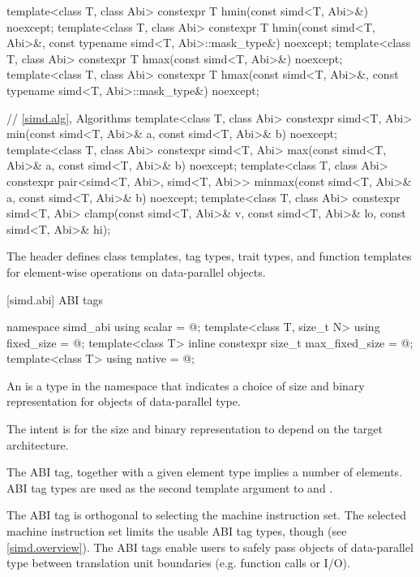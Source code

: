 \begin{codeblock}
{  template<class T, class Abi>
    constexpr T hmin(const simd<T, Abi>&) noexcept;
  template<class T, class Abi>
    constexpr T hmin(const simd<T, Abi>&, const typename simd<T, Abi>::mask_type&) noexcept;
  template<class T, class Abi>
    constexpr T hmax(const simd<T, Abi>&) noexcept;
  template<class T, class Abi>
    constexpr T hmax(const simd<T, Abi>&, const typename simd<T, Abi>::mask_type&) noexcept;

  // \ref{simd.alg}, Algorithms
  template<class T, class Abi>
    constexpr simd<T, Abi>
      min(const simd<T, Abi>& a, const simd<T, Abi>& b) noexcept;
  template<class T, class Abi>
    constexpr simd<T, Abi>
      max(const simd<T, Abi>& a, const simd<T, Abi>& b) noexcept;
  template<class T, class Abi>
    constexpr pair<simd<T, Abi>, simd<T, Abi>>
      minmax(const simd<T, Abi>& a, const simd<T, Abi>& b) noexcept;
  template<class T, class Abi>
    constexpr simd<T, Abi>
      clamp(const simd<T, Abi>& v,
            const simd<T, Abi>& lo,
            const simd<T, Abi>& hi);
}
\end{codeblock}

\pnum
The header  defines class templates, tag types, trait types, and function templates for element-wise operations on data-parallel objects.

[simd.abi]{ ABI tags}

\begin{codeblock}
namespace simd_abi {
  using scalar = @\seebelow@;
  template<class T, size_t N> using fixed_size = @\seebelow@;
  template<class T> inline constexpr size_t max_fixed_size = @\impdef@;
  template<class T> using native = @\impdef@;
}
\end{codeblock}

\pnum
An  is a type in the  namespace that indicates a choice of size and binary representation for objects of data-parallel type. \begin{note}The intent is for the size and binary representation to depend on the target architecture.\end{note} The ABI tag, together with a given element type implies a number of elements. ABI tag types are used as the second template argument to  and .

\pnum
\begin{note}The ABI tag is orthogonal to selecting the machine instruction set. The selected machine instruction set limits the usable ABI tag types, though (see \ref{simd.overview}). The ABI tags enable users to safely pass objects of data-parallel type between translation unit boundaries (e.g. function calls or I/O).\end{note}

